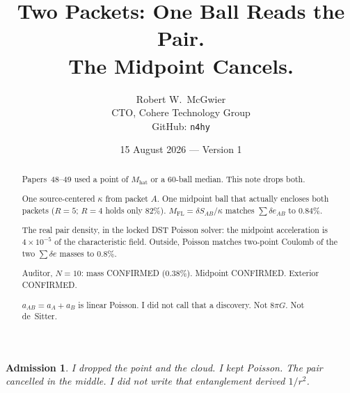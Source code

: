 \documentclass[11pt]{article}
\title{\textbf{Two Packets: One Ball Reads the Pair.\\
The Midpoint Cancels.}}
\author{Robert W.\ McGwier\\
\small CTO, Cohere Technology Group\\
\small GitHub: \texttt{n4hy}}
\date{15 August 2026 --- Version 1}
\newtheorem*{admission}{Admission}
\begin{document}
\maketitle

\begin{abstract}
\noindent
Papers~48--49 used a point of $M_{\mathrm{hat}}$ or a
60-ball median. This note drops both.

One source-centered $\kappa$ from packet $A$. One
midpoint ball that actually encloses both packets
($R=5$; $R=4$ holds only $82\%$).
$M_{\mathrm{FL}}=\delta S_{AB}/\kappa$ matches
$\sum\delta e_{AB}$ to $0.84\%$.

The real pair density, in the locked DST Poisson
solver: the midpoint acceleration is
$4\times 10^{-5}$ of the characteristic field.
Outside, Poisson matches two-point Coulomb of the
two $\sum\delta e$ masses to $0.8\%$.

Auditor, $N=10$: mass CONFIRMED ($0.38\%$). Midpoint
CONFIRMED. Exterior CONFIRMED.

$a_{AB}=a_A+a_B$ is linear Poisson. I did not call
that a discovery. Not $8\pi G$. Not de~Sitter.
\end{abstract}

\begin{admission}
I dropped the point and the cloud. I kept Poisson.
The pair cancelled in the middle. I did not write
that entanglement derived $1/r^2$.
\end{admission}
\end{document}
